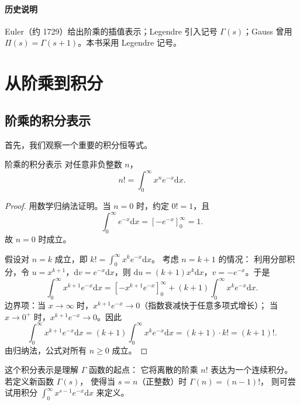 \paragraph{历史说明}
Euler（约 1729）给出阶乘的插值表示；Legendre 引入记号 $\Gamma(s)$；Gauss 曾用 $\Pi(s)=\Gamma(s+1)$。本书采用 Legendre 记号。


\section{从阶乘到积分}\label{sec:factorial_to_integral}

\subsection{阶乘的积分表示}

首先，我们观察一个重要的积分恒等式。

\begin{theorem}{阶乘的积分表示}{}\label{thm:factorial-integral}
对任意非负整数 $n$，
\begin{equation}
    n! = \int_0^\infty x^n e^{-x} \mathrm{d} x.
    \label{eq:factorial-integral}
\end{equation}
\end{theorem}

\begin{proof}
用数学归纳法证明。当 $n = 0$ 时，约定 $0! = 1$，且
\[
\int_0^\infty e^{-x} \mathrm{d} x = \left[ -e^{-x} \right]_0^\infty = 1.
\]
故 $n = 0$ 时成立。

假设对 $n = k$ 成立，即 $k! = \int_0^\infty x^k e^{-x}\mathrm{d} x$。
考虑 $n = k+1$ 的情况：
利用分部积分，令 $u = x^{k+1}$，$\mathrm{d}v = e^{-x}\mathrm{d} x$，则
$\mathrm{d}u = (k+1)x^k \mathrm{d} x$，$v = -e^{-x}$。于是
\[
\int_0^\infty x^{k+1} e^{-x} \mathrm{d} x
= \left[ -x^{k+1} e^{-x} \right]_0^\infty + (k+1) \int_0^\infty x^k e^{-x} \mathrm{d} x.
\]
边界项：当 $x \to \infty$ 时，$x^{k+1} e^{-x} \to 0$（指数衰减快于任意多项式增长）；
当 $x \to 0^+$ 时，$x^{k+1} e^{-x} \to 0$。因此
\[
\int_0^\infty x^{k+1} e^{-x} \mathrm{d} x = (k+1) \int_0^\infty x^k e^{-x} \mathrm{d} x
= (k+1) \cdot k! = (k+1)!.
\]
由归纳法，公式对所有 $n \ge 0$ 成立。
\end{proof}


这个积分表示是理解 $\Gamma$ 函数的起点：
它将离散的阶乘 $n!$ 表达为一个连续积分。
若定义新函数 $\Gamma(s)$，
使得当 $s = n$（正整数）时 $\Gamma(n) = (n-1)!$，
则可尝试用积分 $\int_0^\infty x^{s-1} e^{-x}\mathrm{d} x$ 来定义。


